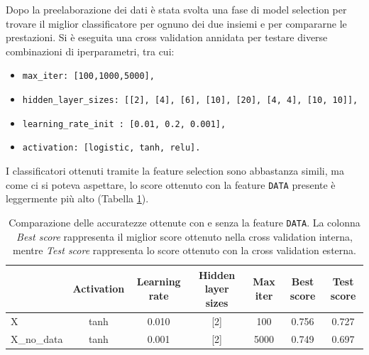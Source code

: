\documentclass[12pt, twoside, letterpaper]{report}
\begin{document}
				Dopo la preelaborazione dei dati è stata svolta una fase di model selection per trovare il miglior classificatore per ognuno dei due insiemi e per compararne le prestazioni. Si è eseguita una cross validation annidata per testare diverse combinazioni di iperparametri, tra cui: 
			\begin{itemize}
				\item \texttt{max\_iter: [100,1000,5000],}
	          	\item \texttt{hidden\_layer\_sizes: [[2], [4], [6], [10], [20], [4, 4], [10, 10]],}
	          	\item \texttt{learning\_rate\_init : [0.01, 0.2, 0.001],}
	          	\item \texttt{activation: [logistic, tanh, relu].}
			\end{itemize}
			I classificatori ottenuti tramite la feature selection sono abbastanza simili, ma come ci si poteva aspettare, lo score ottenuto con la feature \texttt{DATA} presente è leggermente più alto (Tabella \ref{tab:score_con_e_senza_data}). 

			\begin{table}
				\centering
				\begin{tabular}{lcccccc}
				\toprule
				 & Activation &  Learning rate & Hidden layer sizes &  Max iter &    Best score &  Test score \\
				\midrule
				X &       tanh &               0.010 &                [2] &       100 &  0.756 &    0.727 \\
				X\_no\_data &      tanh &               0.001 &                [2] &      5000 &  0.749 &    0.697 \\
				\bottomrule
				\end{tabular}
				\caption{Comparazione delle accuratezze ottenute con e senza la feature \texttt{DATA}. La colonna \textit{Best score} rappresenta il miglior score ottenuto nella cross validation interna, mentre \textit{Test score} rappresenta lo score ottenuto con la cross validation esterna.}
				\label{tab:score_con_e_senza_data}
			\end{table}	
			
\end{document}
